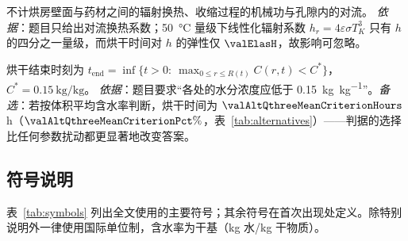 \begin{assumption}\label{as:minor}
不计烘房壁面与药材之间的辐射换热、收缩过程的机械功与孔隙内的对流。
\emph{依据}：题目只给出对流换热系数；\SI{50}{\celsius} 量级下线性化辐射系数 $h_r=4\varepsilon\sigma T_K^3$ 只有 $h$ 的四分之一量级，而烘干时间对 $h$ 的弹性仅 $\valElasH$，故影响可忽略。
\end{assumption}

\begin{assumption}[烘干结束判据，题给]\label{as:criterion}
烘干结束时刻为 $t_{\mathrm{end}}=\inf\{t>0:\ \max_{0\le r\le R(t)}C(r,t)<C^\ast\}$，$C^\ast=\SI{0.15}{\kilo\gram\per\kilo\gram}$。
\emph{依据}：题目要求“各处的水分浓度应低于 \SI{0.15}{\kilo\gram\per\kilo\gram}”。\emph{备选}：若按体积平均含水率判断，烘干时间为 $\valAltQthreeMeanCriterionHours$ h（$\valAltQthreeMeanCriterionPct\%$，表~\ref{tab:alternatives}）——判据的选择比任何参数扰动都更显著地改变答案。
\end{assumption}

\subsection{符号说明}
表~\ref{tab:symbols} 列出全文使用的主要符号；其余符号在首次出现处定义。除特别说明外一律使用国际单位制，含水率为干基（\si{\kilo\gram} 水/\si{\kilo\gram} 干物质）。

